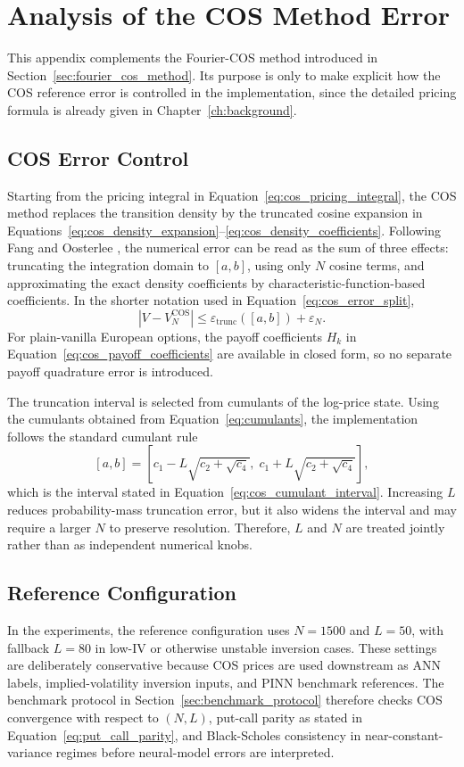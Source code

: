 \chapter{Analysis of the COS Method Error}
\label{app:cos_error}

This appendix complements the Fourier-COS method introduced in Section~\ref{sec:fourier_cos_method}. Its purpose is only to make explicit how the COS reference error is controlled in the implementation, since the detailed pricing formula is already given in Chapter~\ref{ch:background}.

\section{COS Error Control}

Starting from the pricing integral in Equation~\eqref{eq:cos_pricing_integral}, the COS method replaces the transition density by the truncated cosine expansion in Equations~\eqref{eq:cos_density_expansion}--\eqref{eq:cos_density_coefficients}. Following Fang and Oosterlee \cite{fang_oosterlee_2009}, the numerical error can be read as the sum of three effects: truncating the integration domain to \([a,b]\), using only \(N\) cosine terms, and approximating the exact density coefficients by characteristic-function-based coefficients. In the shorter notation used in Equation~\eqref{eq:cos_error_split},
\[
    |V-V_N^{\mathrm{COS}}|
    \le
    \varepsilon_{\mathrm{trunc}}([a,b])+\varepsilon_N.
\]
For plain-vanilla European options, the payoff coefficients \(H_k\) in Equation~\eqref{eq:cos_payoff_coefficients} are available in closed form, so no separate payoff quadrature error is introduced.

The truncation interval is selected from cumulants of the log-price state. Using the cumulants obtained from Equation~\eqref{eq:cumulants}, the implementation follows the standard cumulant rule
\[
    [a,b]
    =
    \left[
    c_1-L\sqrt{c_2+\sqrt{c_4}},
    \;
    c_1+L\sqrt{c_2+\sqrt{c_4}}
    \right],
\]
which is the interval stated in Equation~\eqref{eq:cos_cumulant_interval}. Increasing \(L\) reduces probability-mass truncation error, but it also widens the interval and may require a larger \(N\) to preserve resolution. Therefore, \(L\) and \(N\) are treated jointly rather than as independent numerical knobs.

\section{Reference Configuration}

In the experiments, the reference configuration uses \(N=1500\) and \(L=50\), with fallback \(L=80\) in low-IV or otherwise unstable inversion cases. These settings are deliberately conservative because COS prices are used downstream as ANN labels, implied-volatility inversion inputs, and PINN benchmark references. The benchmark protocol in Section~\ref{sec:benchmark_protocol} therefore checks COS convergence with respect to \((N,L)\), put-call parity as stated in Equation~\eqref{eq:put_call_parity}, and Black-Scholes consistency in near-constant-variance regimes before neural-model errors are interpreted.

